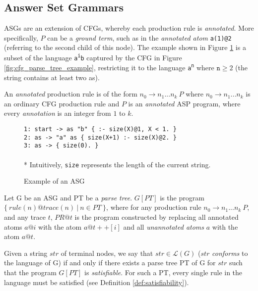 \subsection{Answer Set Grammars}

ASGs are an extension of CFGs, whereby each production rule is \textit{annotated}. More specifically, $P$ can be a \textit{ground term}, such as in the \textit{annotated atom} \texttt{a(1)@2} (referring to the second child of this node). The example shown in Figure \ref{fig:asg_example} is a subset of the language \texttt{a\textsuperscript{i}b} captured by the CFG in Figure \ref{fig:cfg_parse_tree_example},  restricting it to the language \texttt{a\textsuperscript{n}} where $\texttt{n} \ge 2$ (the string contains at least two as).

\begin{definition}
 An \textit{annotated} production rule is of the form $n_0 \to n_1 ... n_k\ P$ where $n_0 \to n_1 ... n_k$ is an ordinary CFG production rule and $P$ is an \textit{annotated} ASP program, where every \textit{annotation} is an integer from $1$ to $k$.
\end{definition}

\begin{figure}[H]
\texttt{1: start -> as "b" \{ :- size(X)@1, X < 1. \} \\
           2: as -> "a" as \space\space\space\{ size(X+1) :- size(X)@2. \} \\
           3: as -> \space\space\space\space\space\space\space\space\space\space\{ size(0). \} \\}\\
* Intuitively, \texttt{size} represents the length of the current string.
\caption{Example of an ASG}
\label{fig:asg_example}
\end{figure}

\begin{definition}
Let G be an ASG and PT be a \textit{parse tree}. $G[PT]$ is the program $\{\ rule(n)@trace(n)\ |\ n \in PT\ \}$, where for any production rule $n_0 \to n_1...n_k\ P$, and any trace $t$, $PR@t$ is the program constructed by replacing all annotated atoms $a@i$ with the atom $a@t++[i]$ and all \textit{unannotated atoms} $a$ with the atom $a@t$.
\end{definition}

\begin{definition}
Given a string $str$ of terminal nodes, we say that $str \in \mathcal{L}(G)$ ($str$ \textit{conforms} to the language of G) if and only if there exists a parse tree PT of G for $str$ such that the program $G[PT]$ is \textit{satisfiable}. For such a PT, every single rule in the language must be satisfied (see Definition \ref{def:satisfiability}).
\end{definition}

